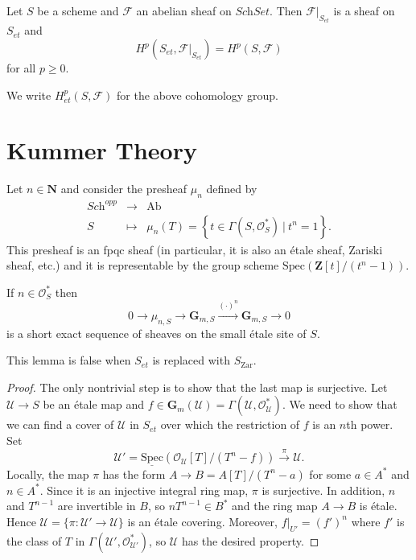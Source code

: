\begin{proposition}
Let $S$ be a scheme and $\mathcal{F}$ an abelian sheaf on $\textit{Sch}Set$. 
Then $\mathcal{F}|_{S_{et}}$ is a sheaf on $S_{et}$ and 
$$
H^p(S_{et}, \mathcal{F}|_{S_{et}}) = H^p(S, \mathcal{F}) 
$$
for all $p \geq 0$. 
\end{proposition}

\noindent
We write $H_{et}^p(S,\mathcal{F})$ for the above cohomology group.

\section{Kummer Theory}
\label{section-kummer}

\noindent
Let $n \in \mathbf{N}$ and consider the presheaf $\mu_n$ defined by
$$
\begin{matrix}
\textit{Sch}^{opp} & \longrightarrow  & \text{Ab} \\
S & \longmapsto &  \mu_n(T) =  \left\{t \in \Gamma(S, \mathcal{O}_S^*) \  | \ 
t^n = 1 \right\}.
\end{matrix}
$$
This presheaf is an fpqc sheaf (in particular, it is also an \'etale sheaf, 
Zariski sheaf, etc.) and it is representable by the group scheme $\text{Spec} 
(\mathbf{Z}[t]/(t^n-1))$. 

\begin{lemma} \label{lem:KummerSequence}
If $n\in \mathcal{O}_S^*$ then 
$$
0\to \mu_{n, S} \to \mathbf{G}_{m, S} \xrightarrow{(\cdot)^n} \mathbf{G}_{m, 
S}\to 0
$$
is a short exact sequence of sheaves on the small \'etale site of  $S$. 
\end{lemma}

\begin{remark}
This lemma is false when $S_{et}$ is replaced with $S_\mathrm{Zar}$.
\end{remark}

\begin{proof}
The only nontrivial step is to show that the last map is surjective. Let 
$\mathcal{U} \to S$ be an \'etale map and $f \in \mathbf{G}_m(\mathcal{U}) = 
\Gamma(\mathcal{U}, \mathcal{O}_\mathcal{U}^*)$. We need to show that we can 
find a cover of $\mathcal{U}$ in $S_{et}$ over which the restriction of $f$ is 
an $n$th power. Set
$$
\mathcal{U}' = \underline{\text{Spec}} (\mathcal{O}_\mathcal{U}[T] / (T^n-f)) 
\xrightarrow{\pi} \mathcal{U}.
$$ 
Locally,  the map $\pi$ has the form $A \to B = A[T] / (T^n-a)$ for some $a \in 
A^*$ and $n \in A^*$. Since it is an injective integral ring map, $\pi$ is 
surjective. In addition, $n$ and $T^{n-1}$ are invertible in $B$, so $nT^{n-1} 
\in B^*$ and the ring map $A \to B$ is \'etale. Hence $\mathcal{U} = \{\pi : 
\mathcal{U}' \to \mathcal{U}\}$ is an \'etale covering. Moreover, $f|_{U'} = 
(f')^n$ where $f'$ is the class of $T$ in $\Gamma(\mathcal{U}', 
\mathcal{O}_{\mathcal{U}'}^*)$, so $\mathcal{U}$ has the desired property.  
\end{proof}

